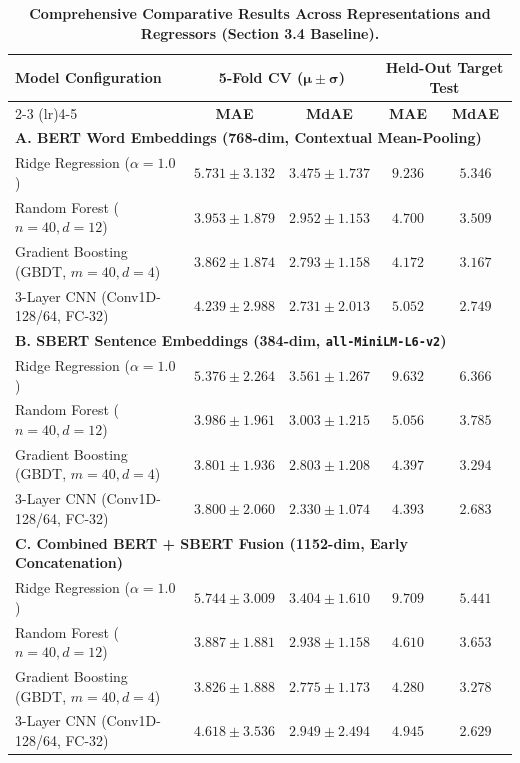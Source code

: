 \documentclass[11pt,a4paper]{article}
\begin{document}
\begin{table}[H]
\centering
\small
\caption{\textbf{Comprehensive Comparative Results Across Representations and Regressors (Section 3.4 Baseline).}}
\label{tab:all_results}
\begin{tabularx}{\linewidth}{@{} X cccc @{}}
\toprule
\multirow{2}{*}{\textbf{Model Configuration}} & \multicolumn{2}{c}{\textbf{5-Fold CV ($\bm{\mu \pm \sigma}$)}} & \multicolumn{2}{c}{\textbf{Held-Out Target Test}} \\
\cmidrule(lr){2-3} \cmidrule(lr){4-5}
 & \textbf{MAE} & \textbf{MdAE} & \textbf{MAE} & \textbf{MdAE} \\
\midrule
\multicolumn{5}{l}{\textbf{\color{primarynavy}A. BERT Word Embeddings (768-dim, Contextual Mean-Pooling)}} \\
\midrule
Ridge Regression ($\alpha=1.0$) & $5.731 \pm 3.132$ & $3.475 \pm 1.737$ & $9.236$ & $5.346$ \\
Random Forest ($n=40, d=12$) & $3.953 \pm 1.879$ & $2.952 \pm 1.153$ & $4.700$ & $3.509$ \\
Gradient Boosting (GBDT, $m=40, d=4$) & $\mathbf{3.862 \pm 1.874}$ & $\mathbf{2.793 \pm 1.158}$ & $\mathbf{4.172}$ & $\mathbf{3.167}$ \\
3-Layer CNN (Conv1D-128/64, FC-32) & $4.239 \pm 2.988$ & $2.731 \pm 2.013$ & $5.052$ & $2.749$ \\
\midrule
\multicolumn{5}{l}{\textbf{\color{primarynavy}B. SBERT Sentence Embeddings (384-dim, \texttt{all-MiniLM-L6-v2})}} \\
\midrule
Ridge Regression ($\alpha=1.0$) & $5.376 \pm 2.264$ & $3.561 \pm 1.267$ & $9.632$ & $6.366$ \\
Random Forest ($n=40, d=12$) & $3.986 \pm 1.961$ & $3.003 \pm 1.215$ & $5.056$ & $3.785$ \\
Gradient Boosting (GBDT, $m=40, d=4$) & $3.801 \pm 1.936$ & $2.803 \pm 1.208$ & $4.397$ & $3.294$ \\
3-Layer CNN (Conv1D-128/64, FC-32) & $\mathbf{3.800 \pm 2.060}$ & $\mathbf{2.330 \pm 1.074}$ & $4.393$ & $\mathbf{2.683}$ \\
\midrule
\multicolumn{5}{l}{\textbf{\color{primarynavy}C. Combined BERT + SBERT Fusion (1152-dim, Early Concatenation)}} \\
\midrule
Ridge Regression ($\alpha=1.0$) & $5.744 \pm 3.009$ & $3.404 \pm 1.610$ & $9.709$ & $5.441$ \\
Random Forest ($n=40, d=12$) & $3.887 \pm 1.881$ & $2.938 \pm 1.158$ & $4.610$ & $3.653$ \\
Gradient Boosting (GBDT, $m=40, d=4$) & $3.826 \pm 1.888$ & $2.775 \pm 1.173$ & $\mathbf{4.280}$ & $3.278$ \\
3-Layer CNN (Conv1D-128/64, FC-32) & $4.618 \pm 3.536$ & $2.949 \pm 2.494$ & $4.945$ & $\mathbf{2.629}$ \\
\bottomrule
\end{tabularx}
\end{table}
\end{document}
